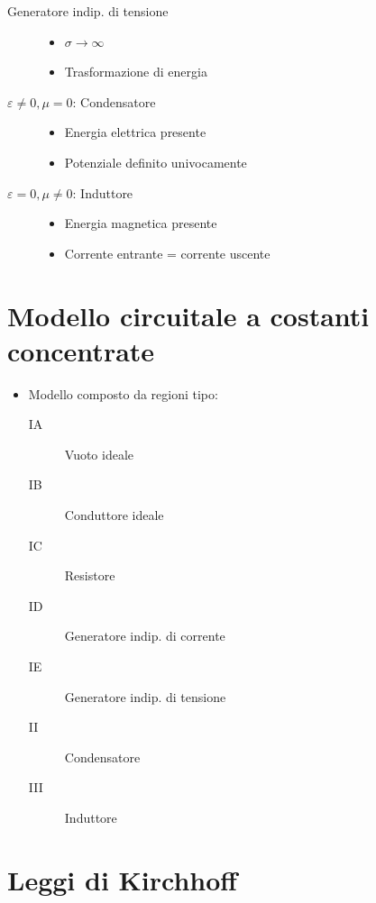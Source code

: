 \begin{itemize}
\begin{description}
        \item[Generatore indip. di tensione]
        \begin{itemize}
            \item \( \sigma \rightarrow \infty \)
            \item Trasformazione di energia
        \end{itemize}

        \item[\( \varepsilon \neq 0, \mu = 0 \): Condensatore]
        \begin{itemize}
            \item Energia elettrica presente
            \item Potenziale definito univocamente
        \end{itemize}

        \item[\( \varepsilon = 0, \mu \neq 0 \): Induttore]
        \begin{itemize}
            \item Energia magnetica presente
            \item Corrente entrante = corrente uscente
        \end{itemize}
    \end{description}
\end{itemize}

\section*{Modello circuitale a costanti concentrate}
\begin{itemize}
    \item Modello composto da regioni tipo:
    \begin{description}
        \item[IA] Vuoto ideale
        \item[IB] Conduttore ideale
        \item[IC] Resistore
        \item[ID] Generatore indip. di corrente
        \item[IE] Generatore indip. di tensione
        \item[II] Condensatore
        \item[III] Induttore
    \end{description}
\end{itemize}

\section*{Leggi di Kirchhoff}
